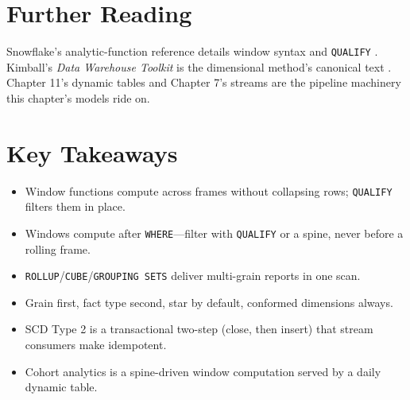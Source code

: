 \section{Further Reading}
Snowflake's analytic-function reference details window syntax and \texttt{QUALIFY} \cite{snowflakeWindowFunctionsDocs}. Kimball's \emph{Data Warehouse Toolkit} is the dimensional method's canonical text \cite{kimball2013toolkit}. Chapter 11's dynamic tables \cite{snowflakeDynamicTablesDocs} and Chapter 7's streams \cite{snowflakeStreamsDocs} are the pipeline machinery this chapter's models ride on.

\section*{Key Takeaways}
\begin{itemize}
    \item Window functions compute across frames without collapsing rows; \texttt{QUALIFY} filters them in place.
    \item Windows compute after \texttt{WHERE}---filter with \texttt{QUALIFY} or a spine, never before a rolling frame.
    \item \texttt{ROLLUP}/\texttt{CUBE}/\texttt{GROUPING SETS} deliver multi-grain reports in one scan.
    \item Grain first, fact type second, star by default, conformed dimensions always.
    \item SCD Type 2 is a transactional two-step (close, then insert) that stream consumers make idempotent.
    \item Cohort analytics is a spine-driven window computation served by a daily dynamic table.
\end{itemize}

